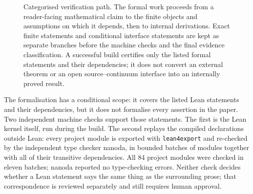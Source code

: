 \begin{figure}[!ht]
\caption{Categorised verification path.  The formal work proceeds from a reader-facing mathematical claim to the finite objects and assumptions on which it depends, then to internal derivations.  Exact finite statements and conditional interface statements are kept as separate branches before the machine checks and the final evidence classification.  A successful build certifies only the listed formal statements and their dependencies; it does not convert an external theorem or an open source--continuum interface into an internally proved result.}
\label{fig:lean-verification-flow}
\end{figure}

The formalisation has a conditional scope: it covers the listed Lean statements
and their dependencies, but it does not formalise every assertion in the paper.
Two independent machine checks support those statements.  The first is the Lean
kernel itself, run during the build.  The second replays the compiled
declarations outside Lean: every project module is exported with
\texttt{lean4export} and re-checked by the independent type checker
\mbox{nanoda}, in bounded batches of modules together with all of their
transitive dependencies.  All 84 project modules were checked in eleven batches; nanoda reported no
type-checking errors.  Neither check decides whether a Lean
statement says the same thing as the surrounding prose; that correspondence is
reviewed separately and still requires human approval.

